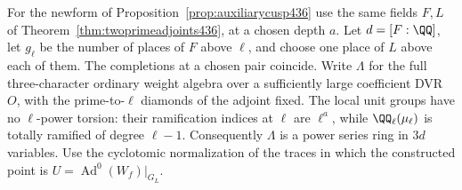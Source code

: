\documentclass[a4paper,11pt]{article}
\theoremstyle{definition}
\theoremstyle{remark}
\numberwithin{equation}{section}
\begin{document}
For the newform of Proposition~\ref{prop:auxiliarycusp436}
use the same fields \(F,L\) of Theorem~\ref{thm:twoprimeadjoints436},
at a chosen depth \(a\). Let \(d=[F:\QQ]\), let \(g_\ell\)
be the number of places of \(F\) above \(\ell\), and choose one
place of \(L\) above each of them. The completions at a chosen
pair coincide. Write \(\Lambda\) for the full three-character
ordinary weight algebra over a sufficiently large coefficient
DVR \(O\), with the prime-to-\(\ell\) diamonds of the adjoint
fixed. The local unit groups have no \(\ell\)-power torsion:
their ramification indices at \(\ell\) are \(\ell^a\), while
\(\QQ_\ell(\mu_\ell)\) is totally ramified of degree \(\ell-1\).
Consequently \(\Lambda\) is a power series ring in \(3d\)
variables. Use the cyclotomic normalization of the traces in
which the constructed point is \(U=\operatorname{Ad}^0(W_f)|_{G_L}\).
\end{document}
